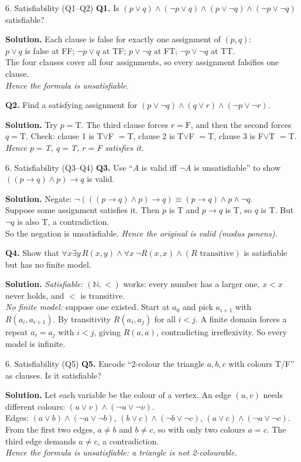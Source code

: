 \documentclass[aspectratio=169,10pt]{beamer}
\newcommand{\qa}[3]{%
  \textbf{Q#1.} #2\par\smallskip
  {\color{ans}\textbf{Solution.} #3}\par\vspace{6pt}}
\begin{document}
\begin{frame}{6. Satisfiability (Q1--Q2)}
\footnotesize
\qa{1}{Is $(p\lor q)\land(\neg p\lor q)\land(p\lor\neg q)\land(\neg p\lor\neg q)$ satisfiable?}
{Each clause is false for exactly one assignment of $(p,q)$:\\
$p\lor q$ is false at FF; $\neg p\lor q$ at TF; $p\lor\neg q$ at FT; $\neg p\lor\neg q$ at TT.\\
The four clauses cover all four assignments, so every assignment falsifies one clause.\\
\emph{Hence the formula is unsatisfiable.}}
\qa{2}{Find a satisfying assignment for $(p\lor\neg q)\land(q\lor r)\land(\neg p\lor\neg r)$.}
{Try $p=\mathrm{T}$. The third clause forces $r=\mathrm{F}$, and then the second forces $q=\mathrm{T}$. Check: clause 1 is T$\lor$F $=$T, clause 2 is T$\lor$F $=$T, clause 3 is F$\lor$T $=$T.\\
\emph{Hence $p=$T, $q=$T, $r=$F satisfies it.}}
\end{frame}

\begin{frame}{6. Satisfiability (Q3--Q4)}
\footnotesize
\qa{3}{Use ``$A$ is valid iff $\neg A$ is unsatisfiable'' to show $((p\to q)\land p)\to q$ is valid.}
{Negate: $\neg(((p\to q)\land p)\to q)\equiv(p\to q)\land p\land\neg q$.\\
Suppose some assignment satisfies it. Then $p$ is T and $p\to q$ is T, so $q$ is T. But $\neg q$ is also T, a contradiction.\\
So the negation is unsatisfiable. \emph{Hence the original is valid (modus ponens).}}
\qa{4}{Show that $\forall x\exists y\,R(x,y)\land\forall x\,\neg R(x,x)\land(R\text{ transitive})$ is satisfiable but has no finite model.}
{\emph{Satisfiable:} $(\mathbb{N},<)$ works: every number has a larger one, $x<x$ never holds, and $<$ is transitive.\\
\emph{No finite model:} suppose one existed. Start at $a_0$ and pick $a_{i+1}$ with $R(a_i,a_{i+1})$. By transitivity $R(a_i,a_j)$ for all $i<j$. A finite domain forces a repeat $a_i=a_j$ with $i<j$, giving $R(a,a)$, contradicting irreflexivity. So every model is infinite.}
\end{frame}

\begin{frame}{6. Satisfiability (Q5)}
\footnotesize
\qa{5}{Encode ``2-colour the triangle $a,b,c$ with colours T/F'' as clauses. Is it satisfiable?}
{Let each variable be the colour of a vertex. An edge $(u,v)$ needs different colours: $(u\lor v)\land(\neg u\lor\neg v)$.\\
Edges: $(a\lor b)\land(\neg a\lor\neg b)$, $(b\lor c)\land(\neg b\lor\neg c)$, $(a\lor c)\land(\neg a\lor\neg c)$.\\
From the first two edges, $a\ne b$ and $b\ne c$, so with only two colours $a=c$. The third edge demands $a\ne c$, a contradiction.\\
\emph{Hence the formula is unsatisfiable: a triangle is not 2-colourable.}}
\end{frame}
\end{document}
